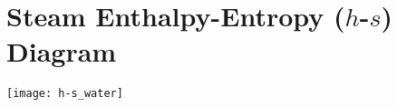 \section{Steam Enthalpy-Entropy ($h$-$s$) Diagram}
\begin{center}
  \texttt{[image: h-s\_water]}
\end{center}
\restoregeometry
